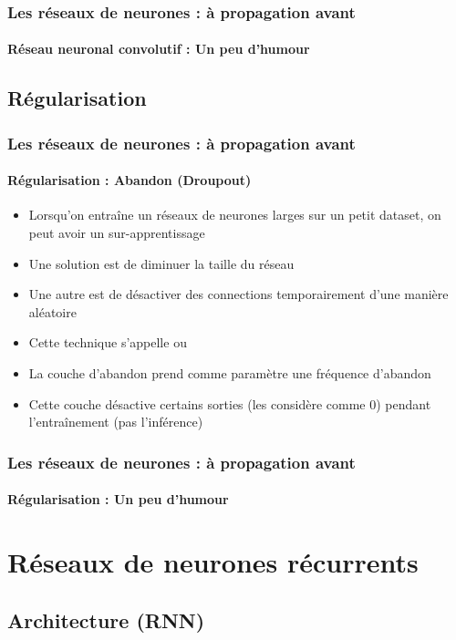 \documentclass[xcolor=table]{beamer}
\begin{document}
\begin{frame}
\frametitle{Les réseaux de neurones : à propagation avant}
\framesubtitle{Réseau neuronal convolutif : Un peu d'humour}


\end{frame}

\subsection{Régularisation}

\begin{frame}
\frametitle{Les réseaux de neurones : à propagation avant}
\framesubtitle{Régularisation : Abandon (Droupout)}

\begin{itemize}
	\item Lorsqu'on entraîne un réseaux de neurones larges sur un petit dataset, on peut avoir un sur-apprentissage
	\item Une solution est de diminuer la taille du réseau 
	\item Une autre est de désactiver des connections temporairement d'une manière aléatoire
	\item Cette technique s'appelle  ou 
	\item La couche d'abandon prend comme paramètre une fréquence d'abandon
	\item Cette couche désactive certains sorties (les considère comme 0) pendant l'entraînement (pas l'inférence)
\end{itemize}

\end{frame}


\begin{frame}
\frametitle{Les réseaux de neurones : à propagation avant}
\framesubtitle{Régularisation : Un peu d'humour}


\end{frame}


\section{Réseaux de neurones récurrents}


\subsection{Architecture (RNN)}
\end{document}
